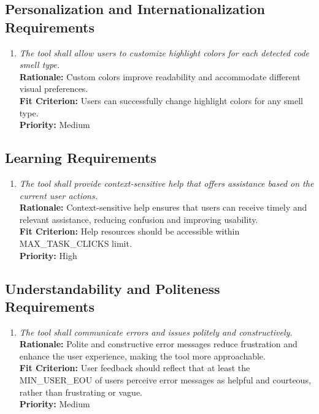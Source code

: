 \documentclass[12pt]{article}
\begin{document}
\subsection{Personalization and Internationalization Requirements}
\begin{enumerate}[label=UHR-PSI \arabic*., wide=0pt, leftmargin=*]
  \item \emph{The tool shall allow users to customize highlight
    colors for each detected code smell type.}
    \\[2mm]
    {\bf Rationale:} Custom colors improve readability and
    accommodate different visual preferences.\\
    {\bf Fit Criterion:} Users can successfully change highlight
    colors for any smell type.\\
    {\bf Priority:} Medium
\end{enumerate}

\subsection{Learning Requirements}
\begin{enumerate}[label=UHR-LRN \arabic*., wide=0pt, leftmargin=*]
  \item \emph{The tool shall provide context-sensitive help that
    offers assistance based on the current user actions.}\\[2mm]
    {\bf Rationale:} Context-sensitive help ensures that users can
    receive timely and relevant assistance, reducing confusion and
    improving usability.\\
    {\bf Fit Criterion:} Help resources should be accessible within
    MAX\_TASK\_CLICKS limit.\\
    {\bf Priority:} High
\end{enumerate}

\subsection{Understandability and Politeness Requirements}
\begin{enumerate}[label=UHR-UPL \arabic*., wide=0pt, leftmargin=*]
  \item \emph{The tool shall communicate errors and issues politely
    and constructively.}\\[2mm]
    {\bf Rationale:} Polite and constructive error messages reduce
    frustration and enhance the user experience, making the tool more
    approachable.\\
    {\bf Fit Criterion:} User feedback should reflect that at least
    the MIN\_USER\_EOU of users perceive error messages as helpful
    and courteous, rather than frustrating or vague.\\
    {\bf Priority:} Medium
\end{enumerate}
\end{document}
